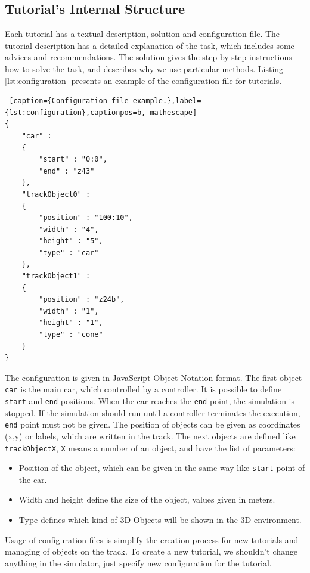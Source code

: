 \subsection{Tutorial's Internal Structure}
Each tutorial has a textual description, solution and configuration file. The tutorial description has a detailed explanation of the task, which includes some advices and recommendations. The solution gives the step-by-step instructions how to solve the task, and describes why we use particular methods. Listing \ref{lst:configuration} presents an example of the configuration file for tutorials.
\bigskip
\begin{lstlisting} [caption={Configuration file example.},label={lst:configuration},captionpos=b, mathescape]
{
    "car" : 
    {
        "start" : "0:0",
        "end" : "z43"
    },
    "trackObject0" :
    {
        "position" : "100:10",
        "width" : "4",
        "height" : "5",
        "type" : "car"
    },
    "trackObject1" :
    {
        "position" : "z24b",
        "width" : "1",
        "height" : "1",
        "type" : "cone"
    }
}
\end{lstlisting}
\bigskip
The configuration is given in JavaScript Object Notation format. The first object \texttt{car} is the main car, which controlled by a controller. It is possible to define \texttt{start} and \texttt{end} positions. When the car reaches the \texttt{end} point, the simulation is stopped. If the simulation should run until a controller terminates the execution, \texttt{end} point must not be given. The position of objects can be given as coordinates (x,y) or labels, which are written in the track. The next objects are defined like \texttt{trackObjectX}, \texttt{X} means a number of an object, and have the list of parameters:
\begin{itemize}
    \item Position of the object, which can be given in the same way like \texttt{start} point of the car.
    \item Width and height define the size of the object, values given in meters.
    \item Type defines which kind of 3D Objects will be shown in the 3D environment.
\end{itemize}
Usage of configuration files is simplify the creation process for new tutorials and managing of objects on the track. To create a new tutorial, we shouldn't change anything in the simulator, just specify new configuration for the tutorial.

